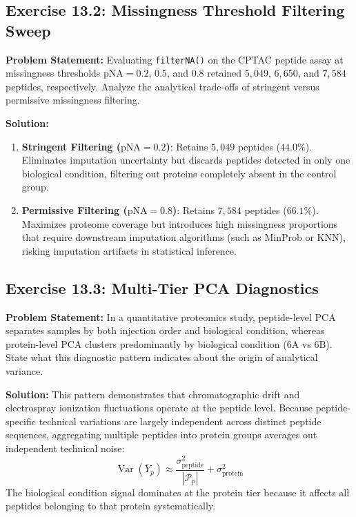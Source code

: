 \documentclass[11pt,twoside,openright]{book}
\begin{document}
\subsection*{Exercise 13.2: Missingness Threshold Filtering Sweep}
\noindent\textbf{Problem Statement:}\enspace
Evaluating \texttt{filterNA()} on the CPTAC peptide assay at missingness thresholds $\text{pNA} = 0.2$, $0.5$, and $0.8$ retained $5{,}049$, $6{,}650$, and $7{,}584$ peptides, respectively. Analyze the analytical trade-offs of stringent versus permissive missingness filtering.

\noindent\textbf{Solution:}\enspace
\begin{enumerate}
\item \textbf{Stringent Filtering ($\text{pNA} = 0.2$)}: Retains $5{,}049$ peptides ($44.0\%$). Eliminates imputation uncertainty but discards peptides detected in only one biological condition, filtering out proteins completely absent in the control group.
\item \textbf{Permissive Filtering ($\text{pNA} = 0.8$)}: Retains $7{,}584$ peptides ($66.1\%$). Maximizes proteome coverage but introduces high missingness proportions that require downstream imputation algorithms (such as MinProb or KNN), risking imputation artifacts in statistical inference.
\end{enumerate}

\subsection*{Exercise 13.3: Multi-Tier PCA Diagnostics}
\noindent\textbf{Problem Statement:}\enspace
In a quantitative proteomics study, peptide-level PCA separates samples by both injection order and biological condition, whereas protein-level PCA clusters predominantly by biological condition ($6\text{A}$ vs $6\text{B}$). State what this diagnostic pattern indicates about the origin of analytical variance.

\noindent\textbf{Solution:}\enspace
This pattern demonstrates that chromatographic drift and electrospray ionization fluctuations operate at the peptide level. Because peptide-specific technical variations are largely independent across distinct peptide sequences, aggregating multiple peptides into protein groups averages out independent technical noise:
\begin{equation}
\operatorname{Var}(\bar{Y}_p) \approx \frac{\sigma_{\text{peptide}}^2}{|\mathcal{P}_p|} + \sigma_{\text{protein}}^2
\end{equation}
The biological condition signal dominates at the protein tier because it affects all peptides belonging to that protein systematically.
\end{document}
